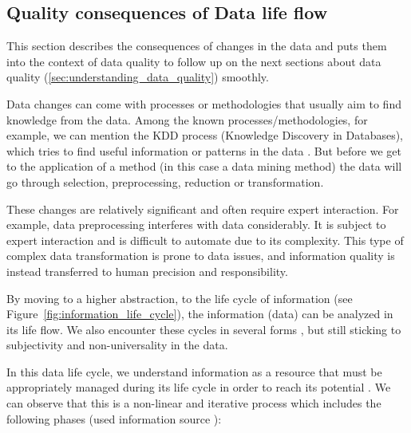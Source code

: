 		\subsection{Quality consequences of Data life flow}
		\label{sec:quality_consequences_of_data_life_flow}
			
			This section describes the consequences of changes in the data and puts them into the context of data quality to follow up on the next sections about data quality (\ref{sec:understanding_data_quality}) smoothly.
			
			Data changes can come with processes or methodologies that usually aim to find knowledge from the data. Among the known processes/methodologies, for example, we can mention the KDD process (Knowledge Discovery in Databases), which tries to find useful information or patterns in the data \cite{Fayyad1996}. But before we get to the application of a method (in this case a data mining method) the data will go through selection, preprocessing, reduction or transformation. 
				
			These changes are relatively significant and often require expert interaction. For example, data preprocessing interferes with data considerably. It is subject to expert interaction and is difficult to automate due to its complexity. This type of complex data transformation is prone to data issues, and information quality is instead transferred to human precision and responsibility.
			
			By moving to a higher abstraction, to the life cycle of information (see Figure~\ref{fig:information_life_cycle}), the information (data) can be analyzed in its life flow. We also encounter these cycles in several forms \cite{Kirkland2015}, but still sticking to subjectivity and non-universality in the data.
			
			
			In this data life cycle, we understand information as a resource that must be appropriately managed during its life cycle in order to reach its potential \cite{McGilvray2008}. We can observe that this is a non-linear and iterative process which includes the following phases (used information source \cite{McGilvray2008}):
			
